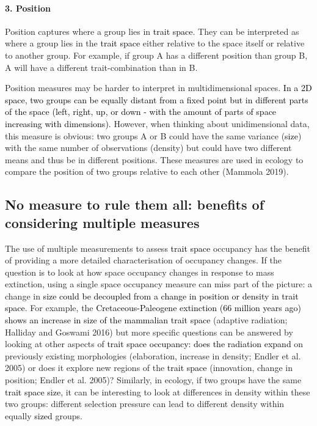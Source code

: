 \documentclass[]{article}
\let\oldparagraph\paragraph
\renewcommand{\paragraph}[1]{\oldparagraph{#1}\mbox{}}
\begin{document}
\paragraph{3. Position}\label{position}

Position captures where a group lies in
\textcolor{black}{trait space}. They can be interpreted as
where a group lies in the \textcolor{black}{trait space}
either relative to the space itself or relative to another group. For
example, if group A has a different position than group B, A will have a
different trait-combination than in B.

Position measures may be harder to interpret in multidimensional spaces.
\textcolor{black}{In a 2D space, two groups can be equally distant from a fixed point but in different parts of the space (left, right, up, or down - with the amount of parts of space increasing with dimensions).}
However, when thinking about unidimensional data, this measure is
obvious: two groups A or B could have the same variance
(\textcolor{black}{size}) with the same number of
observations (density) but could have two different means and thus be in
different positions. These measures are used in ecology to compare the
position of two groups relative to each other (Mammola 2019).

\subsection{No measure to rule them all: benefits of considering
multiple
measures}\label{no-measure-to-rule-them-all-benefits-of-considering-multiple-measures}

The use of multiple measurements to assess
\textcolor{black}{trait space} occupancy has the benefit of
providing a more detailed characterisation of occupancy changes. If the
question is to look at how space occupancy changes in response to mass
extinction, using a single space occupancy measure can miss part of the
picture: a change in
\textcolor{black}{size could be decoupled from a change in position or density in trait space}.
For example, the
\textcolor{black}{Cretaceous-Paleogene extinction (66 million years ago) shows an increase in size of the mammalian trait space}
(adaptive radiation; Halliday and Goswami 2016) but more specific
questions can be answered by looking at other aspects of
\textcolor{black}{trait space occupancy: does the radiation expand}
on previously existing morphologies (elaboration, increase in density;
Endler et al. 2005) or does it explore new regions of the
\textcolor{black}{trait space} (innovation, change in
position; Endler et al. 2005)? Similarly, in ecology, if two groups have
the same \textcolor{black}{trait space size}, it can be
interesting to look at differences in density within these two groups:
different selection pressure can lead to different density within
equally \textcolor{black}{sized} groups.
\end{document}
